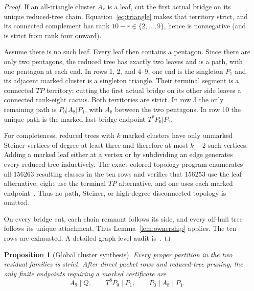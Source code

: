 \documentclass[11pt]{article}
\newtheorem{proposition}[theorem]{Proposition}
\begin{document}
\begin{proof}
If an all-triangle cluster $A_r$ is a leaf, cut the first actual bridge on its
unique reduced-tree chain.  Equation~\eqref{eq:triangle} makes that territory
strict, and its connected complement has rank $10-r\in\{2,\ldots,9\}$, hence
is nonnegative (and is strict from rank four onward).

Assume there is no such leaf.  Every leaf then contains a pentagon.  Since
there are only two pentagons, the reduced tree has exactly two leaves and is a
path, with one pentagon at each end.  In rows 1, 2, and 4--9, one end is the
singleton $P_1$ and its adjacent marked cluster is a singleton triangle.
Their terminal segment is a connected $TP$ territory; cutting the first
actual bridge on its other side leaves a connected rank-eight cactus.  Both
territories are strict.  In row 3 the only remaining path is
$P_0|A_8|P_1$, with $A_8$ between the two pentagons.  In row 10 the unique
path is the marked last-bridge endpoint $T^8P_0|P_1$.

For completeness, reduced trees with $k$ marked clusters have only unmarked
Steiner vertices of degree at least three and therefore at most $k-2$ such
vertices.  Adding a marked leaf either at a vertex or by subdividing an edge
generates every reduced tree inductively.  The exact colored topology program
enumerates all $156263$ resulting classes in the ten rows and verifies that
$156253$ use the leaf alternative, eight use the terminal $TP$ alternative,
and one uses each marked endpoint~\cite{T8PPTopology}.  Thus no path, Steiner,
or high-degree disconnected topology is omitted.

On every bridge cut, each chain remnant follows its side, and every off-hull
tree follows its unique attachment.  Thus Lemma~\ref{lem:ownership} applies.
The ten rows are exhausted.  A detailed graph-level audit is~\cite{T8PPPrune}.
\end{proof}

\begin{proposition}[Global cluster synthesis]\label{prop:global}
Every proper partition in the two residual families is strict.  After direct
packet rows and reduced-tree pruning, the only finite endpoints requiring a
marked certificate are
\begin{equation}\label{eq:endpoints}
 A_9\mid Q,\qquad T^8P_0\mid P_1,
 \qquad P_0\mid A_8\mid P_1.
\end{equation}
\end{proposition}
\end{document}
